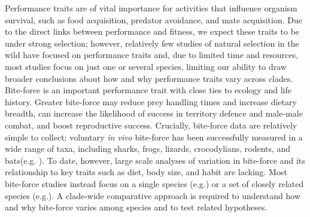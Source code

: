 \documentclass[a4paper, 12pt]{article}
\begin{document}
Performance traits are of vital importance for activities that influence organism survival, such as food acquisition, predator avoidance, and mate acquisition\cite{lailvaux2004performance,legalliard2004,lappin2005weapon,irschick2008}. 
Due to the direct links between performance and fitness, we expect these traits to be under strong selection\cite{arnold1983,irschick2008}; however, relatively few studies of natural selection in the wild have focused on performance traits\cite{irschick2008,kingsolver2012} and, due to limited time and resources, most studies focus on just one or several species, limiting our ability to draw broader conclusions about how and why performance traits vary across clades\cite{irschick2008}. 
Bite-force is an important performance trait with close ties to ecology and life history\cite{herrel1999morphology,anderson2008bite,erickson2014comparative,lappin2014reliable,husak2009fitness}. 
Greater bite-force may reduce prey handling times and increase dietary breadth\cite{herrel1999morphology,herrel2004omnivory,verwaijen2002relationships,van2006seed,taverne2020proximate}, can increase the likelihood of success in territory defence and male-male combat\cite{lailvaux2004performance,lappin2005weapon,huyghe2005morphology,husak2006bite}, and boost reproductive success\cite{lappin2005weapon,husak2006bite,husak2009fitness}.
Crucially, bite-force data are relatively simple to collect; voluntary \textit{in vivo} bite-force has been successfully measured in a wide range of taxa, including sharks, frogs, lizards, crocodylians, rodents, and bats(e.g. \cite{herrel1999morphology,huber2005analysis,santana2010mechanics,becerra2013biting,erickson2014comparative,lappin2014reliable,lappin2017bite}). 
To date, however, large scale analyses of variation in bite-force and its relationship to key traits such as diet, body size, and habit are lacking. 
Most bite-force studies instead focus on a single species (e.g.\cite{husak2006bite}) or a set of closely related species (e.g.\cite{taverne2020proximate}).
A clade-wide comparative approach is required to understand how and why bite-force varies among species and to test related hypotheses.
\end{document}
